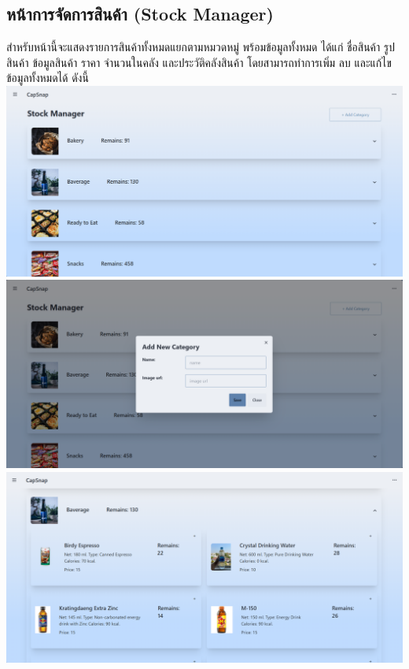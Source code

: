 \subsection{หน้าการจัดการสินค้า (Stock Manager)}
สำหรับหน้านี้จะแสดงรายการสินค้าทั้งหมดแยกตามหมวดหมู่ พร้อมข้อมูลทั้งหมด ได้แก่ ชื่อสินค้า รูปสินค้า ข้อมูลสินค้า ราคา จำนวนในคลัง และประวัติคลังสินค้า โดยสามารถทำการเพิ่ม ลบ และแก้ไขข้อมูลทั้งหมดได้ ดังนี้\\
{
\includegraphics[scale=0.35]{pic/ui/w4.png}
}\\
{
\includegraphics[scale=0.35]{pic/ui/w5.png}
}\\
{
\includegraphics[scale=0.35]{pic/ui/w7.png}
}\\
